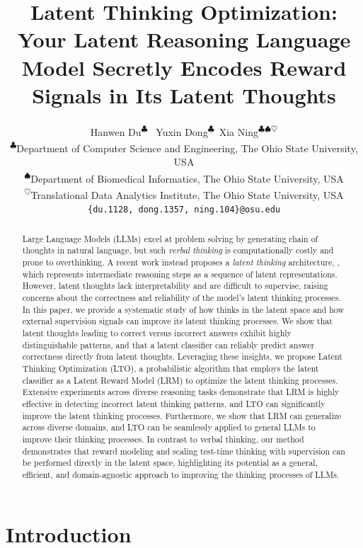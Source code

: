 \documentclass{article} %
\title{Latent Thinking Optimization: Your Latent Reasoning Language Model Secretly Encodes Reward Signals in Its Latent Thoughts}
\author{Hanwen Du\textsuperscript{$\clubsuit$} \ Yuxin Dong\textsuperscript{$\clubsuit$}\ Xia Ning\textsuperscript{$\clubsuit$}\textsuperscript{$\spadesuit$}\textsuperscript{$\heartsuit$}\Letter \\
\textsuperscript{$\clubsuit$}Department of Computer Science
and Engineering, The Ohio State University, USA\\
\textsuperscript{$\spadesuit$}Department of Biomedical Informatics, The Ohio State University, USA\\
\textsuperscript{$\heartsuit$}Translational Data Analytics Institute, The Ohio State University, USA\\
\texttt{\{du.1128, dong.1357, ning.104\}@osu.edu}}
\begin{document}
\maketitle

\begin{abstract}
Large Language Models (LLMs) excel at problem solving by generating chain of thoughts in natural language, but such \textit{verbal thinking} is computationally costly and prone to overthinking. A recent work instead proposes a \textit{latent thinking} architecture, \LRLM, which represents intermediate reasoning steps as a sequence of latent representations. However, latent thoughts lack interpretability and are difficult to supervise, raising concerns about the correctness and reliability of the model's latent thinking processes.
%
In this paper, we provide a systematic study of how \LRLM thinks in the latent space and how external supervision signals can improve its latent thinking processes. We show that latent thoughts leading to correct versus incorrect answers exhibit highly distinguishable patterns, and that a latent classifier can reliably predict answer correctness directly from latent thoughts. Leveraging these insights, we propose Latent Thinking Optimization (LTO), a probabilistic algorithm that employs the latent classifier as a Latent Reward Model (LRM) to optimize the latent thinking processes. Extensive experiments across diverse reasoning tasks demonstrate that LRM is highly effective in detecting incorrect latent thinking patterns, and LTO can significantly improve the latent thinking processes.
%
Furthermore, we show that LRM can generalize across diverse domains, and LTO can be seamlessly applied to general LLMs to improve their thinking processes.
%
In contrast to verbal thinking, our method demonstrates that reward modeling and scaling test-time thinking with supervision can be performed directly in the latent space, highlighting its potential as a general, efficient, and domain-agnostic approach to improving the thinking processes of LLMs.

\end{abstract}

\section{Introduction}


\end{document}
